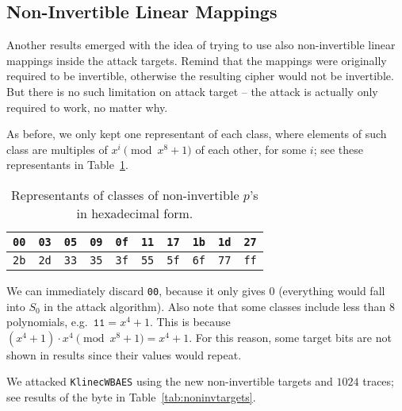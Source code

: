 
\subsection{Non-Invertible Linear Mappings}
\label{sec:noninv}

Another results emerged with the idea of trying to use also non-invertible linear mappings inside the attack targets. Remind that the mappings were originally required to be invertible, otherwise the resulting cipher would not be invertible. But there is no such limitation on attack target -- the attack is actually only required to work, no matter why.

As before, we only kept one representant of each class, where elements of such class are multiples of $x^i\pmod{x^8+1}$ of each other, for some $i$; see these representants in Table~\ref{tab:classreprenoninv}.

\begin{table}[H]   %
	\begin{center}
	\begin{tabular}{| c | c | c | c | c | c | c | c | c | c |}
		\hline
		{\tt 00} & {\tt 03} & {\tt 05} & {\tt 09} & {\tt 0f} & {\tt 11} & {\tt 17} & {\tt 1b} & {\tt 1d} & {\tt 27} \\
		\hline
		{\tt 2b} & {\tt 2d} & {\tt 33} & {\tt 35} & {\tt 3f} & {\tt 55} & {\tt 5f} & {\tt 6f} & {\tt 77} & {\tt ff} \\
		\hline
	\end{tabular}
	\end{center}
\caption{Representants of classes of non-invertible $p$'s in hexadecimal form.}
\label{tab:classreprenoninv}
\end{table}

We can immediately discard {\tt 00}, because it only gives $0$ (everything would fall into $S_0$ in the attack algorithm). Also note that some classes include less than $8$ polynomials, e.g.\ $\texttt{11} = x^4+1$. This is because $(x^4+1)\cdot x^4 \pmod{x^8+1} = x^4+1$. For this reason, some target bits are not shown in results since their values would repeat.

We attacked {\tt KlinecWBAES} using the new non-invertible targets and $1024$ traces; see results of the  byte in Table~\ref{tab:noninvtargets}.

